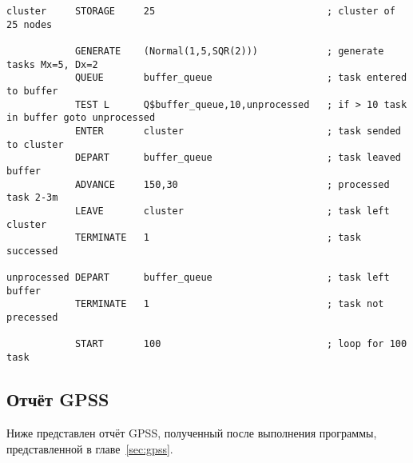 \documentclass[12pt,a4paper,oneside]{extarticle}
\begin{document}
        \begin{lstlisting}  
cluster     STORAGE     25                              ; cluster of 25 nodes
            
            GENERATE    (Normal(1,5,SQR(2)))            ; generate tasks Mx=5, Dx=2
            QUEUE       buffer_queue                    ; task entered to buffer
            TEST L      Q$buffer_queue,10,unprocessed   ; if > 10 task in buffer goto unprocessed
            ENTER       cluster                         ; task sended to cluster
            DEPART      buffer_queue                    ; task leaved buffer
            ADVANCE     150,30                          ; processed task 2-3m
            LEAVE       cluster                         ; task left cluster
            TERMINATE   1                               ; task successed

unprocessed DEPART      buffer_queue                    ; task left buffer
            TERMINATE   1                               ; task not precessed

            START       100                             ; loop for 100 task
        \end{lstlisting}

    \subsection{Отчёт GPSS}
    \label{sec:report}
        Ниже представлен отчёт GPSS, полученный после выполнения программы, представленной в главе~\ref{sec:gpss}.
\end{document}
